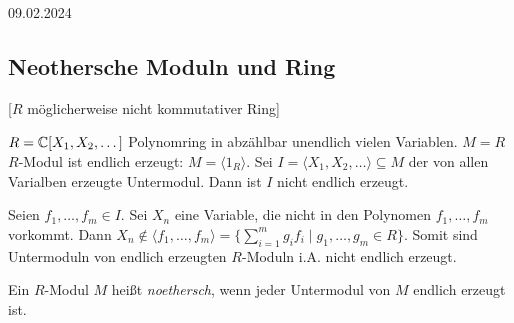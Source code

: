 \documentclass[../main.tex]{subfiles}
\begin{document}
\begin{flushright}
    09.02.2024
\end{flushright}
\subsection{Neothersche Moduln und Ring}
[$R$ möglicherweise nicht kommutativer Ring]
\begin{example}\label{theo:5.40}
    $R=\mathbb{C}[X_1, X_2,\dots]$ Polynomring in abzählbar unendlich vielen Variablen.
    $M=R$ $R$-Modul ist endlich erzeugt: $M=\langle 1_R\rangle$.
    Sei $I=\langle X_1, X_2,\dots \rangle\subseteq M$ der von allen Varialben erzeugte Untermodul.
    Dann ist $I$ nicht endlich erzeugt.
    
    Seien $f_1, \dots, f_m\in I$. Sei $X_n$ eine Variable, die nicht in den Polynomen $f_1,\dots, f_m$  vorkommt.
    Dann $X_n\notin \langle f_1,\dots,f_m\rangle = \{\sum_{i=1}^m g_i f_i \mid g_1,\dots, g_m\in R\}$.
    Somit sind Untermoduln von endlich erzeugten $R$-Moduln i.A. nicht endlich erzeugt.
\end{example}

\begin{definition}
    Ein $R$-Modul $M$ heißt \emph{noethersch}, wenn jeder Untermodul von $M$ endlich erzeugt ist.
\end{definition}
\end{document}
